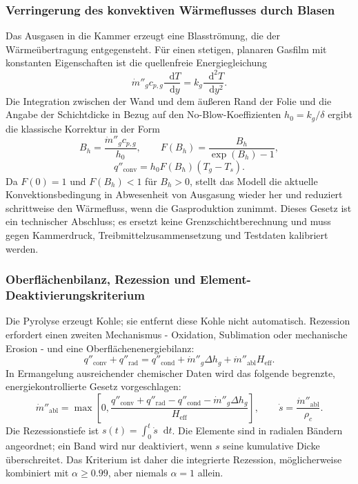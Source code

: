 \documentclass[oneside,openany]{amsdtx}
\newcommand{\dd}{\mathop{}\!\mathrm{d}}
\begin{document}
\subsubsection{Verringerung des konvektiven Wärmeflusses durch Blasen}

Das Ausgasen in die Kammer erzeugt eine Blasströmung, die der Wärmeübertragung entgegensteht. Für einen stetigen, planaren Gasfilm mit konstanten Eigenschaften ist die quellenfreie Energiegleichung
\begin{equation}
  \dot m''_g c_{p,g}\frac{\dd T}{\dd y}
  =k_g\frac{\dd^2T}{\dd y^2}.
\end{equation}
Die Integration zwischen der Wand und dem äußeren Rand der Folie und die Angabe der Schichtdicke in Bezug auf den No-Blow-Koeffizienten \(h_0=k_g/\delta\) ergibt die klassische Korrektur in der Form
\begin{equation}
  B_h=\frac{\dot m''_g c_{p,g}}{h_0},\qquad
  F(B_h)=\frac{B_h}{\exp(B_h)-1},
\end{equation}
\begin{equation}
  \boxed{q''_\mathrm{conv}=h_0F(B_h)(T_g-T_s).}
  \label{eq:blowing}
\end{equation}
Da \(F(0)=1\) und \(F(B_h)<1\) für \(B_h>0\), stellt das Modell die aktuelle Konvektionsbedingung in Abwesenheit von Ausgasung wieder her und reduziert schrittweise den Wärmefluss, wenn die Gasproduktion zunimmt. Dieses Gesetz ist ein technischer Abschluss; es ersetzt keine Grenzschichtberechnung und muss gegen Kammerdruck, Treibmittelzusammensetzung und Testdaten kalibriert werden.

\subsubsection{Oberflächenbilanz, Rezession und Element-Deaktivierungskriterium}

Die Pyrolyse erzeugt Kohle; sie entfernt diese Kohle nicht automatisch. Rezession erfordert einen zweiten Mechanismus - Oxidation, Sublimation oder mechanische Erosion - und eine Oberflächenenergiebilanz:
\begin{equation}
  q''_\mathrm{conv}+q''_\mathrm{rad}
  =q''_\mathrm{cond}+\dot m''_g\Delta h_g
   +\dot m''_\mathrm{abl}H_\mathrm{eff}.
  \label{eq:surface-balance}
\end{equation}
In Ermangelung ausreichender chemischer Daten wird das folgende begrenzte, energiekontrollierte Gesetz vorgeschlagen:
\begin{equation}
  \dot m''_\mathrm{abl}=
  \max\left[0,
  \frac{q''_\mathrm{conv}+q''_\mathrm{rad}-q''_\mathrm{cond}
  -\dot m''_g\Delta h_g}{H_\mathrm{eff}}\right],
  \qquad
  \dot s=\frac{\dot m''_\mathrm{abl}}{\rho_c}.
  \label{eq:recession}
\end{equation}
Die Rezessionstiefe ist \(s(t)=\int_0^t\dot s\dd t\). Die  Elemente sind in radialen Bändern angeordnet; ein Band wird nur deaktiviert, wenn \(s\) seine kumulative Dicke überschreitet. Das Kriterium ist daher die integrierte Rezession, möglicherweise kombiniert mit \(\alpha\ge0.99\), aber niemals \(\alpha=1\) allein.
\end{document}

